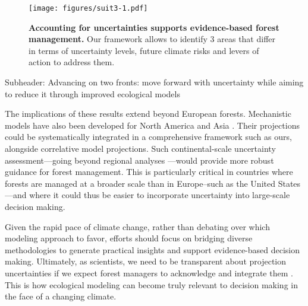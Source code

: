 \documentclass[11pt,letter]{article}
\begin{document}
\begin{figure}
	\centering
	\texttt{[image: figures/suit3-1.pdf]}
	\caption{\textbf{Accounting for uncertainties supports evidence-based forest management.} Our framework allows to identify 3 areas that differ in terms of uncertainty levels, future climate risks and levers of action to address them.}
	\label{fig:manag}
\end{figure}

Subheader: Advancing on two fronts: move forward with uncertainty while aiming to reduce it through improved ecological models

The implications of these results extend beyond European forests. Mechanistic models have also been developed for North America and Asia \citep{Morin2007, Fang2022}. Their projections could be systematically integrated in a comprehensive framework such as ours, alongside correlative model projections. Such continental-scale uncertainty assessment---going beyond regional analyses \citep{Iverson2016}---would provide more robust guidance for forest management. This is particularly critical in countries where forests are managed at a broader scale than in Europe--such as the United States---and where it could thus be easier to incorporate uncertainty into large-scale decision making. 

Given the rapid pace of climate change, rather than debating over which modeling approach to favor, efforts should focus on bridging diverse methodologies to generate practical insights and support evidence-based decision making. Ultimately, as scientists, we need to be transparent about projection uncertainties if we expect forest managers to acknowledge and integrate them \citep{Saltelli2020}. This is how ecological modeling can become truly relevant to decision making in the face of a changing climate.
\end{document}
